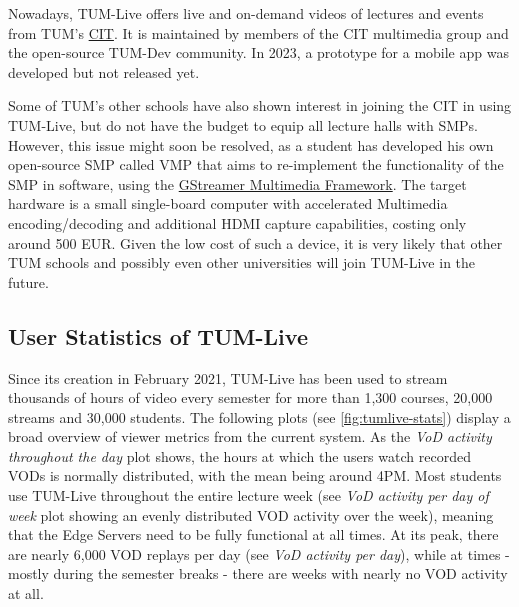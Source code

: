 Nowadays, TUM-Live offers live and on-demand videos of lectures and events from \ac{TUM}'s \href{https://www.cit.tum.de}{\ac{CIT}}\footnotemark[11]. It is maintained by members of the \ac{CIT} multimedia group and the open-source TUM-Dev community. In 2023, a prototype for a mobile app was developed but not released yet\footnotemark[12].

Some of \ac{TUM}'s other schools have also shown interest in joining the \ac{CIT} in using TUM-Live, but do not have the budget to equip all lecture halls with \ac{SMP}s. However, this issue might soon be resolved, as a student has developed his own open-source \ac{SMP} called \ac{VMP} that aims to re-implement the functionality of the \ac{SMP} in software, using the \href{https://gstreamer.freedesktop.org}{GStreamer Multimedia Framework}\footnotemark[13]. The target hardware is a small single-board computer with accelerated Multimedia encoding/decoding and additional HDMI capture capabilities, costing only around 500 EUR. Given the low cost of such a device, it is very likely that other \ac{TUM} schools and possibly even other universities will join TUM-Live in the future.


\break
\subsection{User Statistics of TUM-Live}\label{subsection:user-stats-tumlive}

Since its creation in February 2021, TUM-Live has been used to stream thousands of hours of video every semester for more than 1,300 courses, 20,000 streams and 30,000 students. The following plots (see \autoref{fig:tumlive-stats}) display a broad overview of viewer metrics from the current system. As the \textit{VoD activity throughout the day} plot shows, the hours at which the users watch recorded \ac{VOD}s is normally distributed, with the mean being around 4PM. Most students use TUM-Live throughout the entire lecture week (see \textit{VoD activity per day of week} plot showing an evenly distributed \ac{VOD} activity over the week), meaning that the Edge Servers need to be fully functional at all times. At its peak, there are nearly 6,000 \ac{VOD} replays per day (see \textit{VoD activity per day}), while at times - mostly during the semester breaks - there are weeks with nearly no \ac{VOD} activity at all.

